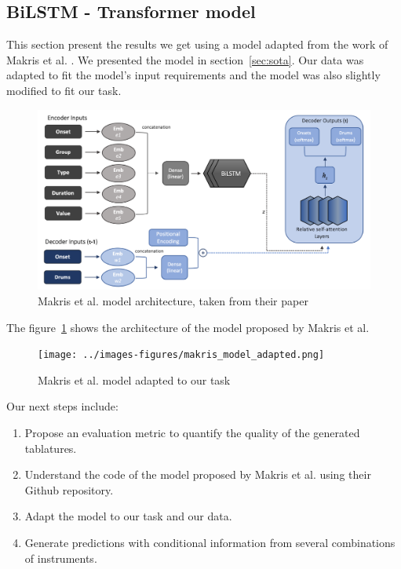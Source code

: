 \subsection{BiLSTM - Transformer model}

This section present the results we get using a model adapted from the work of Makris et al. \cite{makris_conditional_2022}.
We presented the model in section~\ref{sec:sota}.
Our data was adapted to fit the model's input requirements and the model was also slightly modified to fit our task.

\begin{figure}[!ht]
    \centering
    \includegraphics[width=.75\linewidth]{../images-figures/makris_model.png}
    \caption{Makris et al. model architecture, taken from their paper \cite{makris_conditional_2022}}
    \label{fig:makris_model}
\end{figure}

The figure~\ref{fig:makris_model} shows the architecture of the model proposed by Makris et al.

\begin{figure}[!ht]
    \centering
    \texttt{[image: ../images-figures/makris\_model\_adapted.png]}
    \caption{Makris et al. model adapted to our task}
    \label{fig:makris_model_adapted}
\end{figure}


Our next steps include:
\begin{enumerate}
    \item Propose an evaluation metric to quantify the quality of the generated tablatures.
    \item Understand the code of the model proposed by Makris et al. using their Github repository.
    \item Adapt the model to our task and our data.
    \item Generate predictions with conditional information from several combinations of instruments.
\end{enumerate}